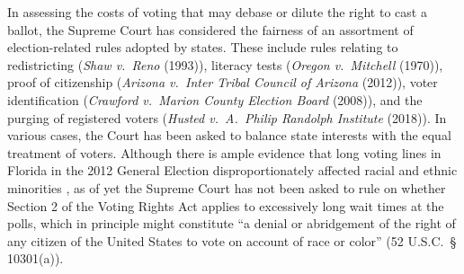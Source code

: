 \documentclass[12pt,titlepage]{article}
\begin{document}
In assessing the costs of voting that may debase or dilute the right
to cast a ballot, the Supreme Court has considered the fairness of an
assortment of election-related rules adopted by states.  These include
rules relating to redistricting (\emph{Shaw v.\ Reno} (1993)),
literacy tests (\emph{Oregon v.\ Mitchell} (1970)), proof of
citizenship (\emph{Arizona v.\ Inter Tribal Council of Arizona}
(2012)), voter identification (\emph{Crawford v.\ Marion County
  Election Board} (2008)), and the purging of registered voters
(\emph{Husted v.\ A.\ Philip Randolph Institute} (2018)). In various
cases, the Court has been asked to balance state interests with the
equal treatment of voters.  Although there is ample evidence that long
voting lines in Florida in the 2012 General Election
disproportionately affected racial and ethnic minorities
\citep{herron_smith2014}, as of yet the Supreme Court has not been
asked to rule on whether Section 2 of the Voting Rights Act applies to
excessively long wait times at the polls, which in principle might
constitute ``a denial or abridgement of the right of any citizen of
the United States to vote on account of race or color'' (52 U.S.C.\ \S
10301(a)).
\end{document}
